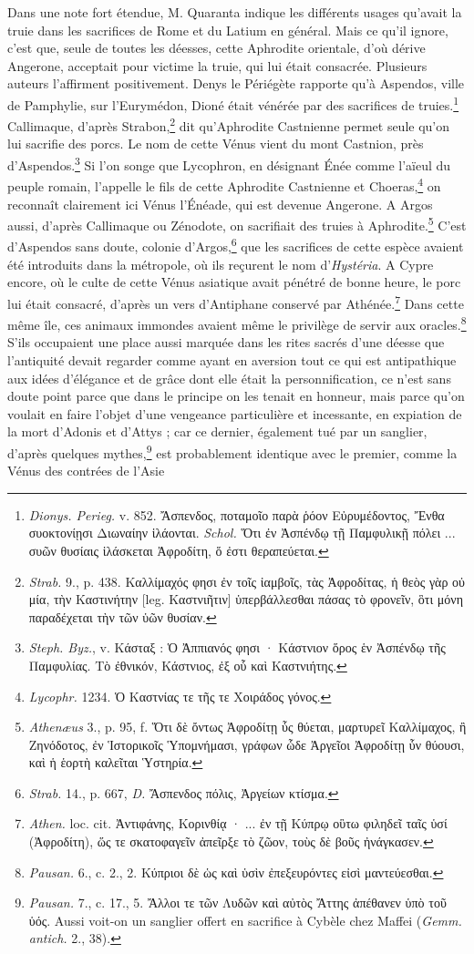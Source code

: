 \documentclass[a4paper, 11pt, oneside, polutonikogreek, french]{article}
\begin{document}
Dans une note fort étendue, M. Quaranta indique les différents usages qu'avait la truie dans les sacrifices de Rome et du Latium en général. Mais ce qu'il ignore, c'est que, seule de toutes les déesses, cette Aphrodite orientale, d'où dérive Angerone, acceptait pour victime la truie, qui lui était consacrée. Plusieurs auteurs l'affirment positivement. Denys le Périégète rapporte qu'à Aspendos, ville de Pamphylie, sur l'Eurymédon, Dioné était vénérée par des sacrifices de truies.\footnote{\emph{Dionys. Perieg.} v. 852. Ἄσπενδος, ποταμοῖο παρὰ ῥόον Εὐρυμέδοντος, Ἔνθα συοκτονίῃσι Διωναίην ἱλάονται. \emph{Schol.} Ὅτι ἐν Ἀσπένδῳ τῇ Παμφυλικῇ πόλει ... συῶν θυσίαις ἱλάσκεται Ἀφροδίτη, ὅ ἐστι θεραπεύεται.} Callimaque, d'après Strabon,\footnote{\emph{Strab.} 9., p. 438. Καλλίμαχός φησι ἐν τοῖς ἰαμβοῖς, τὰς Ἀφροδίτας, ἡ θεὸς γὰρ οὐ μία, τὴν Καστινήτην [leg. Καστνιῆτιν] ὑπερβάλλεσθαι πάσας τὸ φρονεῖν, ὃτι μόνη παραδέχεται τὴν τῶν ὑῶν θυσίαν.} dit qu'Aphrodite Castnienne permet seule qu'on lui sacrifie des porcs. Le nom de cette Vénus vient du mont Castnion, près d'Aspendos.\footnote{\emph{Steph. Byz.}, v. Κάσταξ : Ὁ Ἀππιανός φησι · Κάστνιον ὅρος ἑν Ἀσπένδῳ τῆς Παμφυλίας. Τὸ ἐθνικόν, Κάστνιος, ἐξ οὗ καὶ Καστνιήτης.} Si l'on songe que Lycophron, en désignant Énée comme l'aïeul du peuple romain, l'appelle le fils de cette Aphrodite Castnienne et Choeras,\footnote{\emph{Lycophr.} 1234. Ὁ Καστνίας τε τῆς τε Χοιράδος γόνος.} on reconnaît clairement ici Vénus l'Énéade, qui est devenue Angerone. A Argos aussi, d'après Callimaque ou Zénodote, on sacrifiait des truies à Aphrodite.\footnote{\emph{Athenæus} 3., p. 95, f. Ὅτι δὲ ὄντως Ἀφροδίτῃ ὗς θύεται, μαρτυρεῖ Καλλίμαχος, ἢ Ζηνόδοτος, ἐν Ἱστορικοῖς Ὑπομνήμασι, γράφων ὧδε Ἀργεῖοι Ἀφροδίτῃ ὗν θύουσι, καὶ ἡ ἑορτὴ καλεῖται Ὑστηρία.} C'est d'Aspendos sans doute, colonie d'Argos,\footnote{\emph{Strab.} 14., p. 667, \emph{D.} Ἄσπενδος πόλις, Ἀργείων κτίσμα.} que les sacrifices de cette espèce avaient été introduits dans la métropole, où ils reçurent le nom d'\emph{Hystéria}. A Cypre encore, où le culte de cette Vénus asiatique avait pénétré de bonne heure, le porc lui était consacré, d'après un vers d'Antiphane conservé par Athénée.\footnote{\emph{Athen.} loc. cit. Ἀντιφάνης, Κορινθίᾳ · ... ἐν τῇ Κύπρῳ οὓτω φιληδεῖ ταῖς ὑσί (Ἀφροδίτη), ὥς τε σκατοφαγεῖν ἀπεῖρξε τὸ ζῶον, τοὺς δὲ βοῦς ἠνάγκασεν.} Dans cette même île, ces animaux immondes avaient même le privilège de servir aux oracles.\footnote{\emph{Pausan.} 6., c. 2., 2. Κύπριοι δὲ ὡς καὶ ὑσὶν ἐπεξευρόντες εἰσὶ μαντεύεσθαι.} S'ils occupaient une place aussi marquée dans les rites sacrés d'une déesse que l'antiquité devait regarder comme ayant en aversion tout ce qui est antipathique aux idées d'élégance et de grâce dont elle était la personnification, ce n'est sans doute point parce que dans le principe on les tenait en honneur, mais parce qu'on voulait en faire l'objet d'une vengeance particulière et incessante, en expiation de la mort d'Adonis et d'Attys ; car ce dernier, également tué par un sanglier, d'après quelques mythes,\footnote{\emph{Pausan.} 7., c. 17., 5. Ἄλλοι τε τῶν Λυδῶν καὶ αὐτὸς Ἄττης ἀπέθανεν ὑπὸ τοῦ ὑός. Aussi voit-on un sanglier offert en sacrifice à Cybèle chez Maffei (\emph{Gemm. antich.} 2., 38).} est probablement identique avec le premier, comme la Vénus des contrées de l'Asie 
\end{document}

